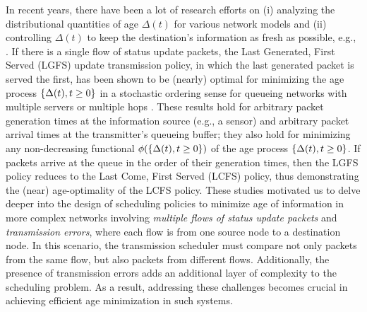 In recent years, there have been a lot of research efforts on (i) analyzing the distributional  quantities of age $\Delta (t)$ for various network models and (ii) controlling $\Delta (t)$ to keep the destination's information as fresh as possible, e.g., 
\cite{SunAoIWorkshop2018,Song1990,KaulYatesGruteser-Infocom2012,2012CISS-KaulYatesGruteser,2012ISIT-YatesKaul,LiInfocom2015,6875100,CostaCodreanuEphremides_TIT, KamKompellaEphremidesTIT,Icc2015Pappas,2015ISITHuangModiano,Suninfocom2016,AgeOfInfo2016,Bedewy2016,BedewyJournal2017,Bedewy2017,BedewyMultihop2017,SunBook,Kosta2017Age,Yates2016, AliTCOM2022,IgorAllerton2016,HsuTWC2017,Vishrant2017,Arunabh2019,He2018,8822722,8812616,9137714,8406891,SunMutualInformation2018,SunNonlinear2019,shisher2021age,ShisherMobiHoc22, shisher2023learning0, shisher2023learning, pan2022age, pan2022optimal, bedewy2021low, ornee2021sampling, bedewy2021optimal, tang2022sampling, ornee2023whittle,yates2021AgeSurvey}. If there is  a single flow of status update packets, the Last Generated, First Served (LGFS) update transmission policy, in which the last generated packet is served the first, has been shown to be (nearly) optimal for minimizing the age process $\{\Delta(t),t\geq 0\}$ in a stochastic ordering sense for queueing networks with multiple servers or multiple hops \cite{Bedewy2016,BedewyJournal2017,Bedewy2017,BedewyMultihop2017,SunBook}. 
These results hold for arbitrary packet generation times at the information source (e.g., a sensor) and arbitrary packet arrival times at the transmitter's queueing buffer; they also hold for minimizing any non-decreasing functional %
$\phi(\{\Delta(t),t\geq 0\})$ of the age process $\{\Delta(t),t\geq 0\}$. If packets arrive at the queue in the order of their generation times, then the LGFS policy reduces to the Last Come, First Served (LCFS) policy, thus demonstrating the (near) age-optimality of the LCFS policy. These studies motivated us to delve deeper into the design of scheduling policies to minimize age of information in more complex networks involving \emph{multiple flows of status update packets} and \emph{transmission errors}, where each flow is from one source node to a destination node. In this scenario, the transmission scheduler must compare not only packets from the same flow, but also packets from different flows. Additionally, the presence of transmission errors adds an additional layer of complexity to the scheduling problem. As a result, addressing these challenges becomes crucial in achieving efficient age minimization in such systems. 

